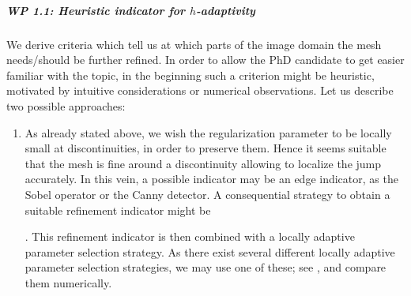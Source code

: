 \documentclass[enabledeprecatedfontcommands,cleardoublepage=empty,headsepline,twoside,11pt,DIV=15,BCOR=12mm,final]{scrartcl}
\begin{document}
 \subparagraph{WP 1.1: Heuristic indicator for $h$-adaptivity} We derive criteria which tell us at which parts of the image domain the mesh needs/should be further refined. In order to allow the PhD candidate to get easier familiar with the topic, in the beginning such a criterion might be heuristic, motivated by intuitive considerations or numerical observations. Let us describe two possible approaches:
\begin{enumerate}
 \item As already stated above, we wish the regularization parameter to be locally small at discontinuities, in order to preserve them. Hence it seems suitable that the mesh is fine around a discontinuity allowing to localize the jump accurately. In this vein, a possible indicator may be an edge indicator, as the Sobel operator or the Canny detector. A consequential strategy to obtain a suitable refinement indicator might be .
This refinement indicator is then combined with a locally adaptive parameter selection strategy. As there exist several different locally adaptive parameter selection strategies, we may use one of these; see \cite{}, and compare them numerically.  \\ %

\end{enumerate}
\end{document}
